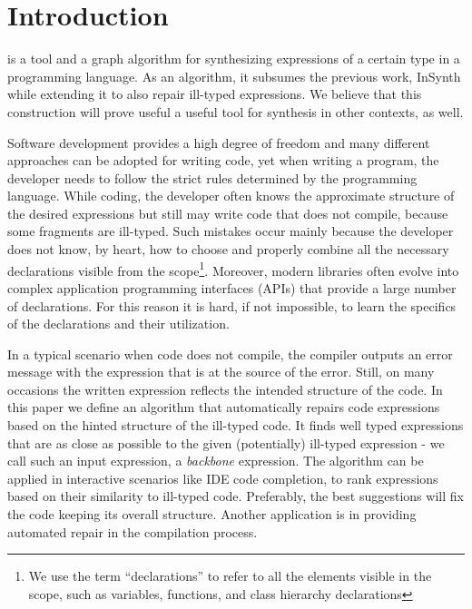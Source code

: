 \section{Introduction}
\ourTool is a tool and a graph algorithm for synthesizing expressions of a certain type in a programming language. As an algorithm, it subsumes the previous work, InSynth \citep{InSynth} while extending it to also repair ill-typed expressions. We believe that this construction will prove useful a useful tool for synthesis in other contexts, as well.

Software development provides a high degree of freedom and
many different approaches can be adopted for writing
code, yet when writing a program, the developer needs to follow
the strict rules determined by the programming language. While coding, the developer often knows the
approximate structure of the desired expressions but still may write code
that does not compile, because some fragments are ill-typed.
Such mistakes occur mainly because the developer does not
know, by heart, how to choose and properly combine all the necessary
declarations visible from the scope\footnote{We use the term ``declarations'' 
to refer to all the elements visible in the scope, such as variables, functions, and class
hierarchy declarations}.
Moreover, modern libraries often evolve into complex 
application programming interfaces (APIs) that provide
a large number of declarations. For this reason 
it is hard, if not impossible, to learn the specifics of
the declarations and their utilization.

In a typical scenario when code does not compile, the compiler outputs
an error message with the expression that is at the source of the
error. Still, on many occasions the written expression reflects the
intended structure of the code. In this paper we define an algorithm that
automatically repairs code expressions based on the hinted structure
of the ill-typed code. It finds well typed expressions that are as close as 
possible to the given (potentially) ill-typed expression - we call such an
input expression, a {\em backbone} expression. The algorithm can be applied 
in interactive scenarios like IDE code completion, to rank expressions 
based on their similarity to ill-typed code. Preferably, the best
suggestions will fix the code keeping its overall structure.
Another application is in providing automated repair in the compilation process.

